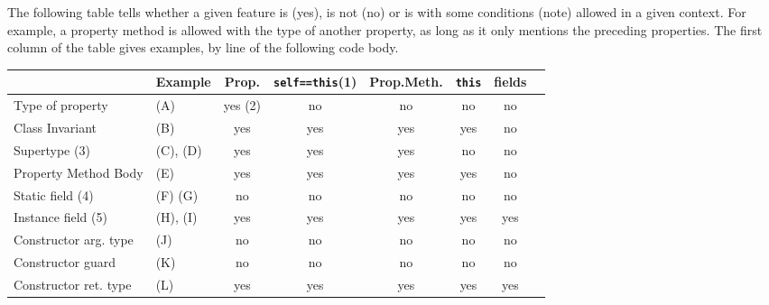 The following table tells whether a given feature is (yes), is not (no) or is
with some conditions (note) allowed in a given context.   For example, a
property method is allowed with the type of another property, as long as it
only mentions the preceding properties. The first column of the table gives
examples, by line of the following code body.

\begin{tabular}{||l|l|c|c|c|c|c|c||}
\hline
~
  & {\bf Example}
  & {\bf Prop.}
  & {\bf {\tt \small self==this}(1)}
  & {\bf Prop.Meth.}
  & {\bf {\tt this}}
  & {\bf {fields}}
\\\hline
Type of property
  & (A)
  & %
    yes (2)
  & no %
  & no %
  & no %
  & no %
\\\hline
Class Invariant
  & (B)
  & yes %
  & yes %
  & yes %
  & yes %
  & no %
\\\hline
Supertype (3)
  & (C), (D)
  & yes%
  & yes%
  & yes%
  & no%
  & no%
\\\hline
Property Method Body
  & (E)
  & yes %
  & yes %
  & yes %
  & yes %
  & no %
\\\hline

Static field (4)
  & (F) (G)
  & no %
  & no %
  & no %
  & no %
  & no %
\\\hline

Instance field (5)
  & (H), (I)
  & yes %
  & yes %
  & yes %
  & yes %
  & yes %
\\\hline

Constructor arg. type
  & (J)
  & no %
  & no %
  & no  %
  & no %
  & no %
\\\hline

Constructor guard
  & (K)
  & no %
  & no %
  & no %
  & no %
  & no %
\\\hline

Constructor ret. type
  & (L)
  & yes %
  & yes %
  & yes %
  & yes %
  & yes %
\\\hline


\end{tabular}
